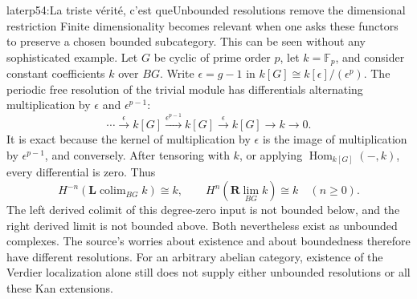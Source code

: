 \begin{dcomment}{later}{p54:La triste vérité, c'est que}{Unbounded resolutions remove the dimensional restriction}
Finite dimensionality becomes relevant when one asks these functors to preserve a chosen bounded subcategory. This can be seen without any sophisticated example. Let $G$ be cyclic of prime order $p$, let $k=\mathbb F_p$, and consider constant coefficients $k$ over $BG$. Write $\epsilon=g-1$ in $k[G]\cong k[\epsilon]/(\epsilon^p)$. The periodic free resolution of the trivial module has differentials alternating multiplication by $\epsilon$ and $\epsilon^{p-1}$:
\[
 \cdots\xrightarrow{\epsilon}k[G]
 \xrightarrow{\epsilon^{p-1}}k[G]
 \xrightarrow{\epsilon}k[G]\longrightarrow k\longrightarrow0.
\]
It is exact because the kernel of multiplication by $\epsilon$ is the image of multiplication by $\epsilon^{p-1}$, and conversely. After tensoring with $k$, or applying $\operatorname{Hom}_{k[G]}(-,k)$, every differential is zero. Thus
\[
 H^{-n}(\mathbf L\operatorname{colim}_{BG}k)\cong k,
 \qquad
 H^n(\mathbf R\lim_{BG}k)\cong k
 \quad(n\geq0).
\]
The left derived colimit of this degree-zero input is not bounded below, and the right derived limit is not bounded above. Both nevertheless exist as unbounded complexes. The source's worries about existence and about boundedness therefore have different resolutions. For an arbitrary abelian category, existence of the Verdier localization alone still does not supply either unbounded resolutions or all these Kan extensions.
\end{dcomment}


